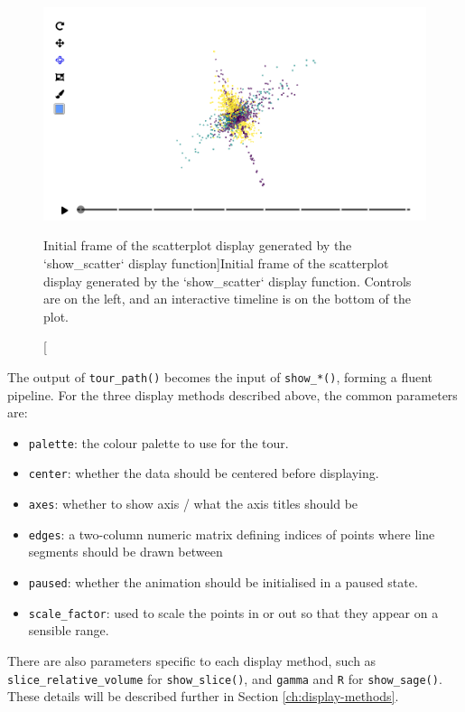 \begin{Schunk}
\begin{figure}
\includegraphics[width=\textwidth]{figures/implementation/pdfsense_scatter_3d} \caption[Initial frame of the scatterplot display generated by the `show\_scatter` display function]{Initial frame of the scatterplot display generated by the `show\_scatter` display function. Controls are on the left, and an interactive timeline is on the bottom of the plot.}\label{fig:scatter-display}
\end{figure}
\end{Schunk}

The output of \texttt{tour\_path()} becomes the input of
\texttt{show\_*()}, forming a fluent pipeline. For the three display
methods described above, the common parameters are:

\begin{itemize}
\tightlist
\item
  \texttt{palette}: the colour palette to use for the tour.
\item
  \texttt{center}: whether the data should be centered before
  displaying.
\item
  \texttt{axes}: whether to show axis / what the axis titles should be
\item
  \texttt{edges}: a two-column numeric matrix defining indices of points
  where line segments should be drawn between
\item
  \texttt{paused}: whether the animation should be initialised in a
  paused state.
\item
  \texttt{scale\_factor}: used to scale the points in or out so that
  they appear on a sensible range.
\end{itemize}

There are also parameters specific to each display method, such as
\texttt{slice\_relative\_volume} for \texttt{show\_slice()}, and
\texttt{gamma} and \texttt{R} for \texttt{show\_sage()}. These details
will be described further in Section \ref{ch:display-methods}.

